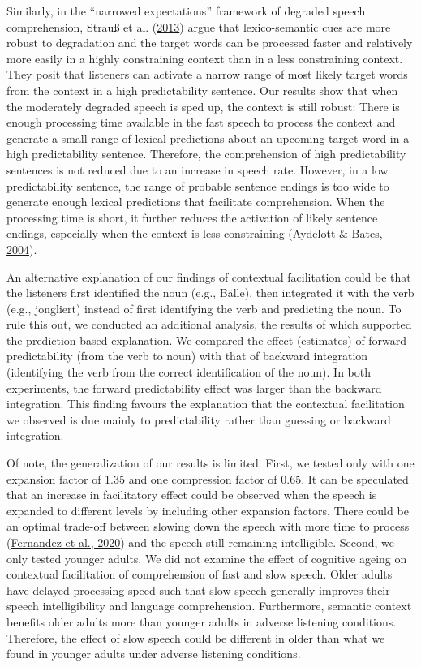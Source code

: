 \documentclass[a4paper, nobind]{templates/ociamthesis}
\begin{document}
Similarly, in the ``narrowed expectations'' framework of degraded speech comprehension, Strauß et al. (\protect\hyperlink{ref-Strauss2013}{2013}) argue that lexico-semantic cues are more robust to degradation and the target words can be processed faster and relatively more easily in a highly constraining context than in a less constraining context.
They posit that listeners can activate a narrow range of most likely target words from the context in a high predictability sentence.
Our results show that when the moderately degraded speech is sped up, the context is still robust:
There is enough processing time available in the fast speech to process the context and generate a small range of lexical predictions about an upcoming target word in a high predictability sentence.
Therefore, the comprehension of high predictability sentences is not reduced due to an increase in speech rate.
However, in a low predictability sentence, the range of probable sentence endings is too wide to generate enough lexical predictions that facilitate comprehension.
When the processing time is short, it further reduces the activation of likely sentence endings, especially when the context is less constraining (\protect\hyperlink{ref-Aydelott2004}{Aydelott \& Bates, 2004}).

An alternative explanation of our findings of contextual facilitation could be that the listeners first identified the noun (e.g., Bälle), then integrated it with the verb (e.g., jongliert) instead of first identifying the verb and predicting the noun.
To rule this out, we conducted an additional analysis, the results of which supported the prediction-based explanation.
We compared the effect (estimates) of forward-predictability (from the verb to noun) with that of backward integration (identifying the verb from the correct identification of the noun).
In both experiments, the forward predictability effect was larger than the backward integration.
This finding favours the explanation that the contextual facilitation we observed is due mainly to predictability rather than guessing or backward integration.

Of note, the generalization of our results is limited. First, we tested only with one expansion factor of 1.35 and one compression factor of 0.65.
It can be speculated that an increase in facilitatory effect could be observed when the speech is expanded to different levels by including other expansion factors.
There could be an optimal trade-off between slowing down the speech with more time to process (\protect\hyperlink{ref-Fernandez2020}{Fernandez et al., 2020}) and the speech still remaining intelligible.
Second, we only tested younger adults.
We did not examine the effect of cognitive ageing on contextual facilitation of comprehension of fast and slow speech.
Older adults have delayed processing speed such that slow speech generally improves their speech intelligibility and language comprehension.
Furthermore, semantic context benefits older adults more than younger adults in adverse listening conditions.
Therefore, the effect of slow speech could be different in older than what we found in younger adults under adverse listening conditions.
\end{document}
